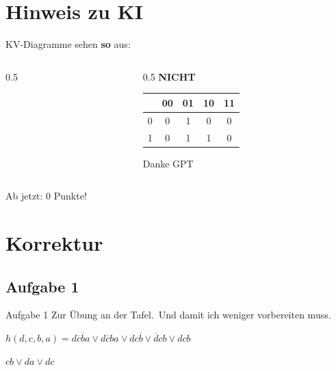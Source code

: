 \documentclass[aspectratio=169,usepdftitle=true,11pt,ngerman,t]{beamer}
\subtitle{Tutorium 8}
\date{07. Juli 2026}
\begin{document}
\section[Böse Böse Böse]{Hinweis zu KI}
\begin{frame}{KV-Diagramme sehen \textbf{so} aus:}\onslide<+->
    \begin{columns}[T]
    \begin{column}{0.5\textwidth}
    \end{column}
    \begin{column}{0.5\textwidth}
        \onslide<+->\textbf{NICHT}\vspace*{2\baselineskip}

        \begin{tabular}{c|cccc}%
            & 00 & 01 & 10 & 11 \\
            \hline%
            0 & 0 & 1 & 0 & 0 \\
            1 & 0 & 1 & 1 & 0 \\
        \end{tabular}

        {\tiny Danke GPT}
    \end{column}
    \end{columns}\vspace*{2\baselineskip}

    \onslide<+->Ab jetzt: \alert{0 Punkte}!
\end{frame}

\section{Korrektur}

\subsection{Aufgabe 1}
\begin{frame}{Aufgabe 1}\onslide<+->
    Zur Übung an der Tafel.\onslide<+->~Und damit ich weniger vorbereiten muss.\onslide<+->
    \begin{exercise}
        \(h(d,c,b,a)=d\overline c\overline ba\lor d\overline cba\lor dc\overline b\lor\overline dcb\lor dcb\)
    \end{exercise}
    \onslide<+->
    \begin{solve}[DMF]
        \(cb \lor da \lor dc\)
    \end{solve}
\end{frame}
\end{document}
